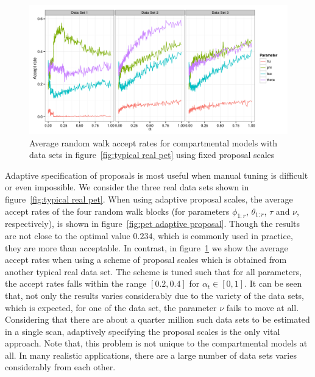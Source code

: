 \begin{figure}[t]
  \includegraphics[width=\linewidth]{fig/Fixed_Proposal}
  \caption{Average random walk accept rates for \pet compartmental models with
    data sets in figure~\ref{fig:typical real pet} using fixed proposal
    scales}
  \label{fig:pet fixed proposal}
\end{figure}

Adaptive specification of proposals is most useful when manual tuning is
difficult or even impossible. We consider the three real \pet data sets shown
in figure~\ref{fig:typical real pet}. When using adaptive proposal scales, the
average accept rates of the four random walk blocks (for parameters
$\phi_{1:r}$, $\theta_{1:r}$, $\tau$ and $\nu$, respectively), is shown in
figure~\ref{fig:pet adaptive proposal}. Though the results are not close to
the optimal value $0.234$, which is commonly used in practice, they are more
than acceptable. In contrast, in figure~\ref{fig:pet fixed proposal} we show
the average accept rates when using a scheme of proposal scales which is
obtained from another typical real \pet data set. The scheme is tuned such
that for all parameters, the accept rates falls within the range $[0.2, 0.4]$
for $\alpha_t \in [0, 1]$. It can be seen that, not only the results varies
considerably due to the variety of the data sets, which is expected, for one
of the data set, the parameter $\nu$ fails to move at all. Considering that
there are about a quarter million such data sets to be estimated in a single
\pet scan, adaptively specifying the proposal scales is the only vital
approach. Note that, this problem is not unique to the \pet compartmental
models at all. In many realistic applications, there are a large number of
data sets varies considerably from each other.

